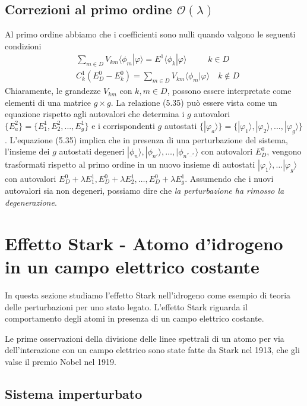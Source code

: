 \subsection{Correzioni al primo ordine $\mathcal{O}(\lambda)$}
Al primo ordine abbiamo che i coefficienti sono nulli quando valgono le seguenti condizioni 
\begin{align}
	& \sum_{m \in D} V_{km} \langle \phi_m|\varphi \rangle = E^1 \langle \phi_k| \varphi \rangle \quad \quad \;\; k \in D \\[0.5cm]
	& C_k^1(E_D^0-E_k^0) = \sum_{m \in D} V_{km} \langle \phi_{m} | \varphi \rangle \quad  k \not \in D
\end{align}
Chiaramente, le grandezze $V_{km}$ con $k,m \in D$, possono essere interpretate come elementi di una matrice $g \times g$. La relazione (5.35) pu\`o essere vista come un equazione rispetto agli autovalori che determina i $g$ autovalori $\{ E_{a}^2 \} = \{ E_{1}^1,E_{2}^2,...,E_{g}^1\} $ e i corrispondenti $g$ autostati $\{|\varphi_a \rangle  \} = \{ |\varphi_1 \rangle, |\varphi_2 \rangle ,...,|\varphi_g \rangle \} $. L'equazione (5.35) implica che in presenza di una perturbazione del sistema, l'insieme dei $g$ autostati degeneri $|\phi_n \rangle , |\phi_{n'} \rangle, \ldots , |\phi_{n^{'' \ldots ''}} \rangle  $ con autovalori $E_{D}^0$, vengono trasformati rispetto al primo ordine in un nuovo insieme di autostati $|\varphi_{1} \rangle, \ldots | \varphi_{g} \rangle $ con autovalori $E_{D}^0 + \lambda E_{1}^1,E_{D}^0 + \lambda E_{2}^1, \ldots,E_{D}^0 + \lambda E_{g}^1$.
Assumendo che i nuovi autovalori sia non degeneri, possiamo dire che \textit{la perturbazione ha rimosso la degenerazione}.

\section{Effetto Stark - Atomo d'idrogeno in un campo elettrico costante}

In questa sezione studiamo l'effetto Stark nell'idrogeno come esempio di teoria delle perturbazioni per uno stato legato. L'effetto Stark riguarda il comportamento degli atomi in presenza di un campo elettrico costante. 

Le prime osservazioni della divisione delle linee spettrali di un atomo per via dell'interazione con un campo elettrico sono state fatte da Stark nel 1913, che gli valse il premio Nobel nel 1919.
\newpage

\subsection{Sistema imperturbato}

